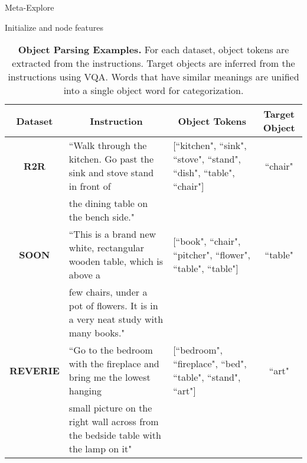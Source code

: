 \documentclass[10pt,twocolumn,letterpaper]{article}
\begin{document}
\begin{algorithm}[htb]
\SetAlgoLined
\DontPrintSemicolon
        \caption{Meta-Explore} \label{alg:meta-explore}
        \;
        \;
        Initialize  and node features\;
\end{algorithm}

\begin{table*}[]
\centering
\setlength{\tabcolsep}{3.4pt}
\fontsize{7}{10}\selectfont
\begin{tabular}{c|l|l|c}
\toprule
\textbf{Dataset} & \multicolumn{1}{c|}{\textbf{Instruction}} & \multicolumn{1}{c|}{\textbf{Object Tokens}} & \multicolumn{1}{c}{\textbf{Target Object}} \\ \hline\hline
\textbf{R2R} & ``Walk through the kitchen. Go past the sink and stove stand in front of & {[}``kitchen", ``sink", ``stove", ``stand", ``dish", ``table", ``chair"{]} & ``chair"\\
 & the dining table on the bench side." &  \\ \hline
\textbf{SOON} & ``This is a brand new white, rectangular wooden table, which is above a & {[}``book",  ``chair", ``pitcher", ``flower", ``table", ``table"{]} & ``table"\\
 & few chairs, under a pot of flowers. It is in a very neat study with many books." &  \\ \hline
\textbf{REVERIE} & ``Go to the bedroom with the fireplace and bring me the lowest hanging & {[}``bedroom", ``fireplace", ``bed", ``table", ``stand", ``art"{]} & ``art"\\
 & small picture on the right wall across from the bedside table with the lamp on it" & \\
 \bottomrule
\end{tabular}\caption{\small \textbf{Object Parsing Examples.} For each dataset, object tokens are extracted from the instructions. Target objects are inferred from the instructions using VQA. Words that have similar meanings are unified into a single object word for categorization.}
\label{tab:object-parsing-examples}\vspace{-0.4cm}
\end{table*}
\end{document}
